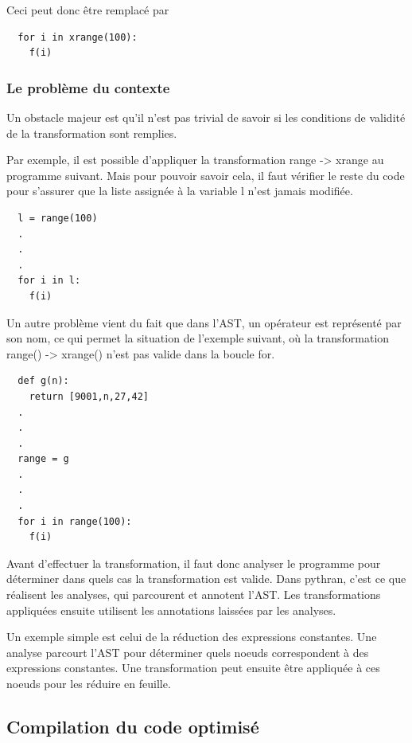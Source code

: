 \documentclass[a4paper]{article}
\begin{document}
Ceci peut donc être remplacé par

\begin{verbatim}
  for i in xrange(100):
    f(i)
\end{verbatim}

\subsubsection{Le problème du contexte}

Un obstacle majeur est qu'il n'est pas trivial de savoir si les
conditions de validité de la transformation sont remplies.

Par exemple, il est possible d'appliquer la transformation range ->
xrange au programme suivant. Mais pour pouvoir savoir cela, il faut
vérifier le reste du code pour s'assurer que la liste assignée à la
variable l n'est jamais modifiée.

\begin{verbatim}
  l = range(100)
  .
  .
  .
  for i in l:
    f(i)
\end{verbatim}

Un autre problème vient du fait que dans l'AST, un opérateur est
représenté par son nom, ce qui permet la situation de l'exemple
suivant, où la transformation range() -> xrange() n'est pas valide
dans la boucle for.

\begin{verbatim}
  def g(n):
    return [9001,n,27,42]
  .
  .
  .
  range = g
  .
  .
  .
  for i in range(100):
    f(i)
\end{verbatim}

Avant d'effectuer la transformation, il faut donc analyser le
programme pour déterminer dans quels cas la transformation est
valide. Dans pythran, c'est ce que réalisent les analyses, qui
parcourent et annotent l'AST. Les transformations appliquées ensuite
utilisent les annotations laissées par les analyses.

Un exemple simple est celui de la réduction des expressions
constantes. Une analyse parcourt l'AST pour déterminer quels noeuds
correspondent à des expressions constantes. Une transformation peut
ensuite être appliquée à ces noeuds pour les réduire en feuille.

\subsection{Compilation du code optimisé}
\end{document}
